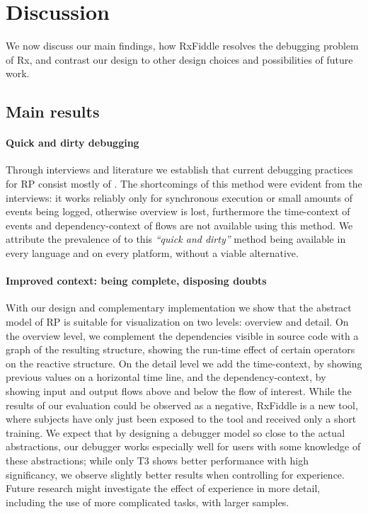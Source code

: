 \section{Discussion} We now discuss our main findings, how RxFiddle
resolves the debugging problem of Rx, and contrast our design to other
design choices and possibilities of future work.

\subsection{Main results}
\paragraph{Quick and dirty debugging} Through interviews and literature
we establish that current debugging practices for RP consist mostly of
\printfdebugging{}.  The shortcomings of this method were evident from
the interviews:  it works reliably only for synchronous execution or
small amounts of events being logged, otherwise overview is lost,
furthermore the time-context of events and dependency-context of flows
are not available using this method.  We attribute the prevalence of
\printfdebugging{} to this \emph{``quick and dirty''} method being
available in every language and on every platform, without a viable
alternative.

\paragraph{Improved context:  being complete, disposing doubts} With our
design and complementary implementation we show that the abstract model
of RP is suitable for visualization on two levels:  overview and detail.
On the overview level, we complement the dependencies visible in source
code with a graph of the resulting structure, showing the run-time
effect of certain operators on the reactive structure.  On the detail
level we add the time-context, by showing previous values on a
horizontal time line, and the dependency-context, by showing input and
output flows above and below the flow of interest.  While the results of
our evaluation could be observed as a negative, RxFiddle is a new tool,
where subjects have only just been exposed to the tool and received only
a short training.  We expect that by designing a debugger model so close
to the actual abstractions, our debugger works especially well for users
with some knowledge of these abstractions; while only T3 shows better
performance with high significancy, we observe slightly better results
when controlling for experience.  Future research might investigate the
effect of experience in more detail, including the use of more
complicated tasks, with larger samples.

